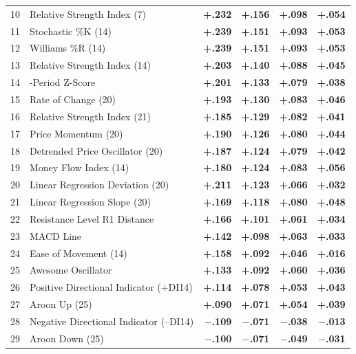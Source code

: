 \documentclass[12pt,a4paper]{article}
\theoremstyle{definition}
\theoremstyle{remark}
\newcommand{\pos}[1]{\textcolor{green1}{\textbf{+#1}}}
\newcommand{\negval}[1]{\textcolor{accent}{\textbf{$-$#1}}}
\begin{document}
\begin{longtable}{c>{\RaggedRight\arraybackslash}p{6.5cm}rrrr}
10 & Relative Strength Index (7)             & \pos{.232} & \pos{.156} & \pos{.098} & \pos{.054} \\
11 & Stochastic \%K (14)       & \pos{.239} & \pos{.151} & \pos{.093} & \pos{.053} \\
12 & Williams \%R (14)    & \pos{.239} & \pos{.151} & \pos{.093} & \pos{.053} \\
13 & Relative Strength Index (14)            & \pos{.203} & \pos{.140} & \pos{.088} & \pos{.045} \\
14 & 50-Period Z-Score         & \pos{.201} & \pos{.133} & \pos{.079} & \pos{.038} \\
15 & Rate of Change (20)            & \pos{.193} & \pos{.130} & \pos{.083} & \pos{.046} \\
16 & Relative Strength Index (21)            & \pos{.185} & \pos{.129} & \pos{.082} & \pos{.041} \\
17 & Price Momentum (20)       & \pos{.190} & \pos{.126} & \pos{.080} & \pos{.044} \\
18 & Detrended Price Oscillator (20)            & \pos{.187} & \pos{.124} & \pos{.079} & \pos{.042} \\
19 & Money Flow Index (14)            & \pos{.180} & \pos{.124} & \pos{.083} & \pos{.056} \\
20 & Linear Regression Deviation (20)  & \pos{.211} & \pos{.123} & \pos{.066} & \pos{.032} \\
21 & Linear Regression Slope (20)      & \pos{.169} & \pos{.118} & \pos{.080} & \pos{.048} \\
22 & Resistance Level R1 Distance           & \pos{.166} & \pos{.101} & \pos{.061} & \pos{.034} \\
23 & MACD Line         & \pos{.142} & \pos{.098} & \pos{.063} & \pos{.033} \\
24 & Ease of Movement (14) & \pos{.158} & \pos{.092} & \pos{.046} & \pos{.016} \\
25 & Awesome Oscillator       & \pos{.133} & \pos{.092} & \pos{.060} & \pos{.036} \\
26 & Positive Directional Indicator (+DI14)            & \pos{.114} & \pos{.078} & \pos{.053} & \pos{.043} \\
27 & Aroon Up (25)      & \pos{.090} & \pos{.071} & \pos{.054} & \pos{.039} \\
28 & Negative Directional Indicator (--DI14)            & \negval{.109} & \negval{.071} & \negval{.038} & \negval{.013} \\
29 & Aroon Down (25)    & \negval{.100} & \negval{.071} & \negval{.049} & \negval{.031} \\

\end{longtable}
\end{document}
